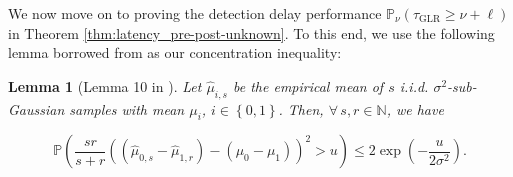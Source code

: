 \documentclass[12pt]{interact}
\newcommand{\lp}{\left(}
\newcommand{\rp}{\right)}
\newcommand{\lbp}{\left\{}
\newcommand{\rbp}{\right\}}
\newcommand{\mrm}{\mathrm}
\newcommand{\mbb}{\mathbb}
\renewcommand{\Pr}{\mathbb{P}}
\theoremstyle{plain}
\newtheorem{lemma}{Lemma}
\begin{document}
We now move on to proving the detection delay performance $\Pr_{\nu} \lp \tau_{\mrm{GLR}} \geq \nu + \ell \rp$ in Theorem \ref{thm:latency_pre-post-unknown}. To this end, we use the following lemma borrowed from \citep{besson2022efficient} as our concentration inequality:

\begin{lemma}[Lemma 10 in \citep{besson2022efficient}] \label{lem:sub_Gaussian_diff}
    Let $\hat{\mu}_{i,s}$ be the empirical mean of $s$ i.i.d. $\sigma^{2}$-sub-Gaussian samples with mean $\mu_{i}$, $i\in\lbp0,1\rbp$. Then, $\forall\,s,r\in\mbb{N}$, we have

    \begin{equation}
        \Pr\lp\frac{sr}{s+r}\lp\lp\hat{\mu}_{0,s}-\hat{\mu}_{1,r}\rp-\lp\mu_{0}-\mu_{1}\rp\rp^{2}>u\rp\leq2\exp\lp-\frac{u}{2\sigma^{2}}\rp.
    \end{equation}
\end{lemma}
\end{document}
